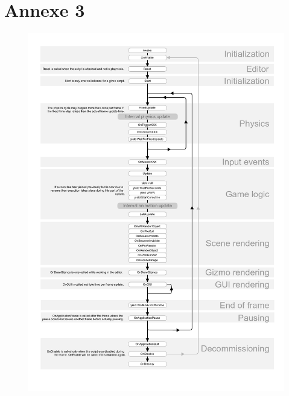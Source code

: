 \chapter*{Annexe 3}
\label{annexe:unity}

\begin{figure}
\centering
\includegraphics[width=\linewidth]{images/monobehaviour_flowchart}
\end{figure}